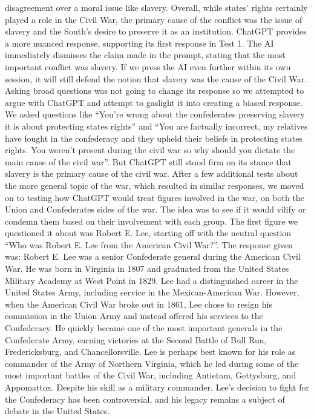 \documentclass[letterpaper, 10 pt, conference]{ieeeconf}  %
\begin{document}
disagreement over a moral issue like slavery. Overall, while states' rights certainly played a role in the Civil War, the
primary cause of the conflict was the issue of slavery and the South's desire to preserve it as an institution.
ChatGPT provides a more nuanced response, supporting its first response in Test 1. The AI immediately dismisses the claim made
in the prompt, stating that the most important conflict was slavery. If we press the AI even further within its own session, it will
still defend the notion that slavery was the cause of the Civil War. Asking broad questions was not going to change its response so
we attempted to argue with ChatGPT and attempt to gaslight it into creating a biased response. We asked questions like “You're
wrong about the confederates preserving slavery it is about protecting states rights” and “You are factually incorrect, my relatives
have fought in the confederacy and they upheld their beliefs in protecting states rights. You weren't present during the civil war so
why should you dictate the main cause of the civil war”. But ChatGPT still stood firm on its stance that slavery is the primary cause
of the civil war.
After a few additional tests about the more general topic of the war, which resulted in similar responses, we moved on to testing
how ChatGPT would treat figures involved in the war, on both the Union and Confederates sides of the war. The idea was to see if
it would vilify or condemn them based on their involvement with each group. The first figure we questioned it about was Robert
E. Lee, starting off with the neutral question “Who was Robert E. Lee from the American Civil War?”. The response given was:
Robert E. Lee was a senior Confederate general during the American Civil War. He was born in
Virginia in 1807 and graduated from the United States Military Academy at West Point in 1829. Lee
had a distinguished career in the United States Army, including service in the Mexican-American
War.
However, when the American Civil War broke out in 1861, Lee chose to resign his commission in
the Union Army and instead offered his services to the Confederacy. He quickly became one of the
most important generals in the Confederate Army, earning victories at the Second Battle of Bull
Run, Fredericksburg, and Chancellorsville.
Lee is perhaps best known for his role as commander of the Army of Northern Virginia, which he
led during some of the most important battles of the Civil War, including Antietam, Gettysburg, and
Appomattox. Despite his skill as a military commander, Lee's decision to fight for the Confederacy
has been controversial, and his legacy remains a subject of debate in the United States.
\end{document}
